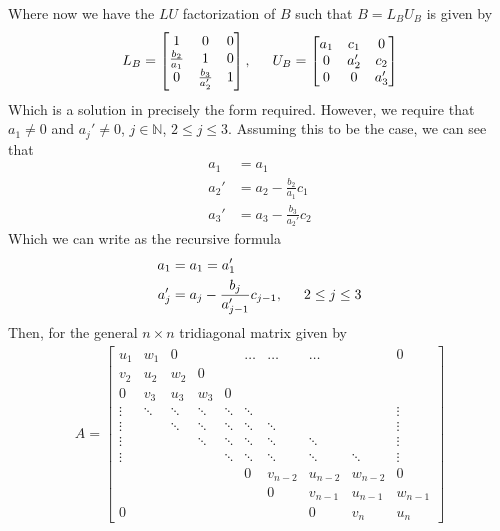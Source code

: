 \documentclass[11pt, letterpaper]{article}
\begin{document}
Where now we have the $LU$ factorization of $B$ such that $B=L_BU_B$ is given by
\begin{align*}
    L_B=
    \begin{bmatrix}
        1 & 0 & 0\\
        \frac{b_2}{a_1} & 1 & 0\\
        0 & \frac{b_3}{a_2'} & 1
    \end{bmatrix}
    ,\indent U_B=
    \begin{bmatrix}
        a_1 & c_1 & 0\\
        0 & a_2' & c_2\\
        0 & 0 & a_3'
    \end{bmatrix}
\end{align*}
Which is a solution in precisely the form required. However, we require that $a_1\neq 0$ and $a_j'\neq 0$,
$j\in\mathbb{N}$, $2\leq j \leq 3$. Assuming this to be the case, we can see that
\begin{align*}
    a_1&=a_1\\
    a_2'&=a_2-\frac{b_2}{a_1}c_1\\
    a_3'&=a_3-\frac{b_3}{a_2'}c_2
\end{align*}
Which we can write as the recursive formula
\begin{align*}
    a_1&=a_1=a_1'\\
    a_j'&=a_j-\frac{b_j}{a_{j - 1}'}c_{j - 1},\indent 2\leq j\leq 3
\end{align*}
Then, for the general $n\times n$ tridiagonal matrix given by
\begin{align*}
    A=
    \begin{bmatrix}
        u_1 & w_1 & 0 & & & \dots & \dots & \dots & & 0\\
        v_2 & u_2 & w_2 & 0 & & & & & & \\
        0 & v_3 & u_3 & w_3 & 0 & & & & & \\
        \vdots & \ddots & \ddots & \ddots & \ddots & \ddots & & & & \vdots\\
        \vdots & &\ddots & \ddots & \ddots & \ddots & \ddots & & & \vdots\\
        \vdots & & &\ddots & \ddots & \ddots & \ddots & \ddots & & \vdots\\
        \vdots & & & &\ddots & \ddots & \ddots & \ddots & \ddots & \vdots\\
        & & & & & 0 & v_{n-2} & u_{n-2} & w_{n-2} & 0\\
        & & & & & & 0 & v_{n-1} & u_{n-1} & w_{n-1}\\
        0 & & & & & & & 0 & v_n & u_n
    \end{bmatrix}
\end{align*}
\end{document}
